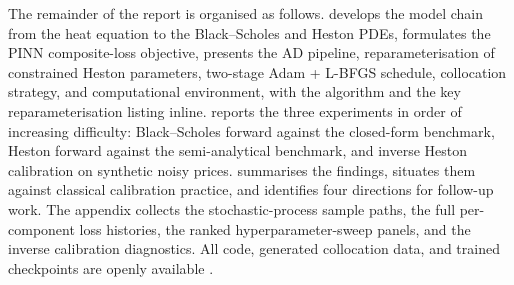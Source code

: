 The remainder of the report is organised as follows.  develops the model chain from the heat equation to the Black--Scholes and Heston PDEs, formulates the PINN composite-loss objective, presents the AD pipeline, reparameterisation of constrained Heston parameters, two-stage Adam + L-BFGS schedule, collocation strategy, and computational environment, with the algorithm and the key reparameterisation listing inline.  reports the three experiments in order of increasing difficulty: Black--Scholes forward against the closed-form benchmark, Heston forward against the semi-analytical benchmark, and inverse Heston calibration on synthetic noisy prices.  summarises the findings, situates them against classical calibration practice, and identifies four directions for follow-up work. The appendix collects the stochastic-process sample paths, the full per-component loss histories, the ranked hyperparameter-sweep panels, and the inverse calibration diagnostics. All code, generated collocation data, and trained checkpoints are openly available \parencite{furnes2026fys5429code,furnes2026fys5429overleaf}.
